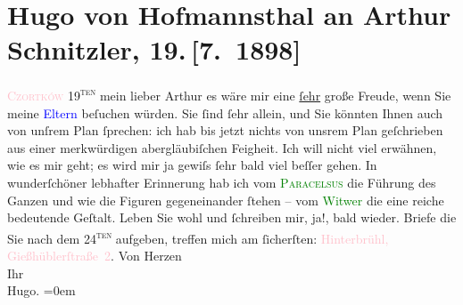 

               \section[Hugo von Hofmannsthal an Arthur Schnitzler, 19. {[}7. 1898{]}]{ Hugo von Hofmannsthal an Arthur Schnitzler, 19. {[}7. 1898{]}}\nopagebreak{}\rehead{ }\normalsize\beginnumbering{} \toendnotes[C]{\smallbreak\pagebreak[2]} 
\toendnotes[C]{\smallbreak}\pstart
           \raggedleft{}{\pb}\textsc{\textcolor{pink}{Czortków}{}\ledrightnote{\textcolor{pink}{Tschortkiw}}}{ }19\textsuperscript{\textsc{ten}}\pend
           \pstart{}mein lieber Arthur\pend\pstart
           es wäre mir eine \uline{ſehr} große Freude, wenn Sie
                    meine \textcolor{blue}{Eltern}{} beſuchen würden. Sie
                    ſind ſehr allein, und Sie könnten Ihnen auch von unſrem Plan ſprechen: ich hab
                    bis jetzt nichts von unsrem Plan geſchrieben aus einer merkwürdigen
                    abergläubiſchen Feigheit. Ich will nicht viel erwähnen, {\pb}wie es mir geht; es wird mir
                    ja gewiſs ſehr bald viel beſſer gehen.\pend
           \pstart
           In wunderſchöner lebhafter Erinnerung hab ich vom \textcolor{green}{\textsc{Paracelsus}}{}\ledrightnote{\textcolor{green}{Paracelsus. Versspiel in einem Akt}} die Führung des Ganzen und wie die Figuren gegeneinander ſtehen –
                    vom \textcolor{green}{Witwer}{}\ledrightnote{\textcolor{green}{Der Witwer}} die eine reiche bedeutende
                    Geſtalt. {\pb}Leben Sie wohl und
                    ſchreiben mir, ja!, bald wieder.\pend
           \pstart
           Briefe die Sie nach dem 24\textsuperscript{\textsc{ten}} aufgeben, treffen mich am ſicherſten: \textcolor{pink}{Hinterbrühl, Gießhüblerſtraße 2}{}\ledrightnote{\textcolor{pink}{Gießhüblerstraße}}.\pend
           \pstart
           Von Herzen{\\[\baselineskip]}Ihr{\\[\baselineskip]}\spacefill\mbox{Hugo.}\pend
           \leftskip=0em{}\endnumbering{}  
      